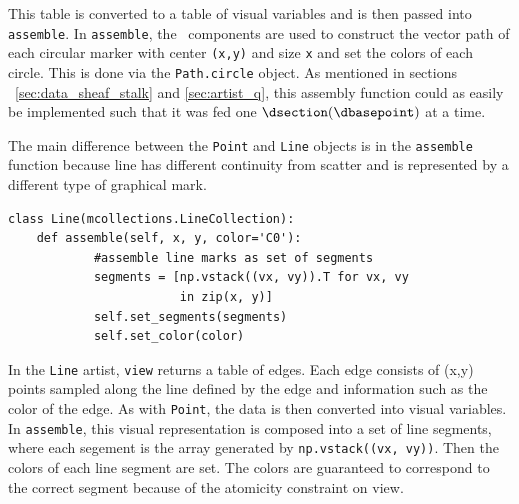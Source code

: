 \documentclass[../main.tex]{subfiles}
\begin{document}
This table is converted to a table of visual variables and is then passed into \texttt{assemble}. In  \texttt{assemble}, the \vsection\ components are used to construct the vector path of each circular marker with center \texttt{(x,y)} and size \texttt{x} and set the colors of each circle. This is done via the \texttt{Path.circle} object. As mentioned in sections ~\ref{sec:data_sheaf_stalk} and \ref{sec:artist_q}, this assembly function could as easily be implemented such that it was fed one $\dsection(\dbasepoint)$ at a time. 

The main difference between the \texttt{Point} and \texttt{Line} objects is in the \texttt{assemble} function because line has different continuity from scatter and is represented by a different type of graphical mark. 

\begin{verbatim}
class Line(mcollections.LineCollection):
    def assemble(self, x, y, color='C0'):
            #assemble line marks as set of segments 
            segments = [np.vstack((vx, vy)).T for vx, vy 
                        in zip(x, y)]
            self.set_segments(segments)
            self.set_color(color)
\end{verbatim}
In the \texttt{Line} artist, \texttt{view} returns a table of edges. Each edge consists of (x,y) points sampled along the line defined by the edge and information such as the color of the edge. As with \texttt{Point}, the data is then converted into visual variables. In \texttt{assemble}, this visual representation is composed into a set of line segments, where each segement is the array generated by \texttt{np.vstack((vx, vy))}. Then the colors of each line segment are set. The colors are guaranteed to correspond to the correct segment because of the atomicity constraint on view. 
\end{document}

